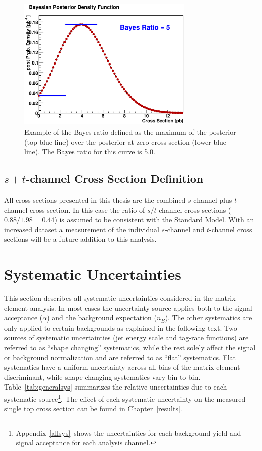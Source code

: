 \begin{figure}[!h!tbp]
\begin{center}
\includegraphics[width=0.75\textwidth]{eps/Limits/BayesRatio.eps}
\end{center}
\vspace{-0.1in}
\caption{Example of the Bayes ratio defined as the maximum of the posterior (top blue line) over the posterior at zero cross section (lower blue line). The Bayes ratio for this curve is 5.0.}
\label{BayesRatio}
\end{figure}

\subsection{$s+t$-channel Cross Section Definition}

All cross sections presented in this thesis are the combined $s$-channel plus $t$-channel cross section. In this case the ratio of $s/t$-channel cross sections ($0.88/1.98=0.44$) is assumed to be consistent with the Standard Model. With an increased dataset a measurement of the individual $s$-channel and $t$-channel cross sections will be a future addition to this analysis.

\clearpage
\section{Systematic Uncertainties}
\label{systematics}
\label{sysdescription}

This section describes all systematic uncertainties considered in the matrix element analysis. In most cases the uncertainty source applies both to the signal acceptance ($\alpha$) and the background expectation ($n_{B}$). The other systematics are only applied to certain backgrounds as explained in the following text. Two sources of systematic uncertainties (jet energy scale and tag-rate functions) are referred to as  ``shape changing'' systematics, while the rest solely affect the signal or background normalization and are referred to as ``flat'' systematics. Flat systematics have a uniform uncertainty across all bins of the matrix element discriminant, while shape changing systematics vary bin-to-bin. Table~\ref{tab:generalsys} summarizes the relative uncertainties due to each systematic source\footnote{Appendix~\ref{allsys}~shows the uncertainties for each background yield and signal acceptance for each analysis channel.}. The effect of each systematic uncertainty on the measured single top cross section can be found in Chapter~\ref{results}.

